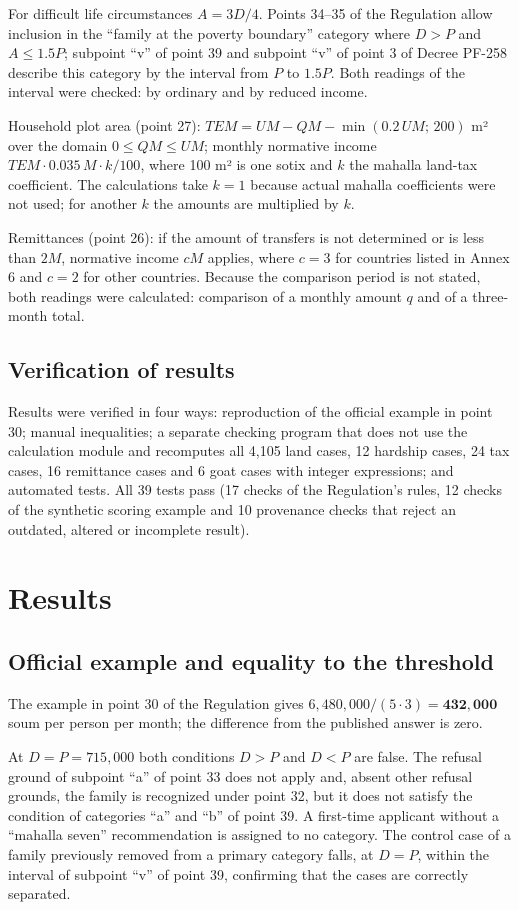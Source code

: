 \documentclass[12pt,a4paper]{extarticle}
\begin{document}
For difficult life circumstances $A=3D/4$. Points 34–35 of the Regulation allow inclusion in the “family at the poverty boundary” category where $D>P$ and $A\le1.5P$; subpoint “v” of point 39 and subpoint “v” of point 3 of Decree PF-258 describe this category by the interval from $P$ to $1.5P$. Both readings of the interval were checked: by ordinary and by reduced income.

Household plot area (point 27): $TEM=UM-QM-\min(0.2\,UM;\,200)$ m² over the domain $0\le QM\le UM$; monthly normative income $TEM\cdot0.035\,M\cdot k/100$, where 100 m² is one sotix and $k$ the mahalla land-tax coefficient. The calculations take $k=1$ because actual mahalla coefficients were not used; for another $k$ the amounts are multiplied by $k$.

Remittances (point 26): if the amount of transfers is not determined or is less than $2M$, normative income $cM$ applies, where $c=3$ for countries listed in Annex 6 and $c=2$ for other countries. Because the comparison period is not stated, both readings were calculated: comparison of a monthly amount $q$ and of a three-month total.

\subsection{Verification of results}
Results were verified in four ways: reproduction of the official example in point 30; manual inequalities; a separate checking program that does not use the calculation module and recomputes all 4,105 land cases, 12 hardship cases, 24 tax cases, 16 remittance cases and 6 goat cases with integer expressions; and automated tests. All 39 tests pass (17 checks of the Regulation’s rules, 12 checks of the synthetic scoring example and 10 provenance checks that reject an outdated, altered or incomplete result).

\section{Results}
\subsection{Official example and equality to the threshold}
The example in point 30 of the Regulation gives $6{,}480{,}000/(5\cdot3)=\mathbf{432{,}000}$ soum per person per month; the difference from the published answer is zero.

At $D=P=715{,}000$ both conditions $D>P$ and $D<P$ are false. The refusal ground of subpoint “a” of point 33 does not apply and, absent other refusal grounds, the family is recognized under point 32, but it does not satisfy the condition of categories “a” and “b” of point 39. A first-time applicant without a “mahalla seven” recommendation is assigned to no category. The control case of a family previously removed from a primary category falls, at $D=P$, within the interval of subpoint “v” of point 39, confirming that the cases are correctly separated.
\end{document}
